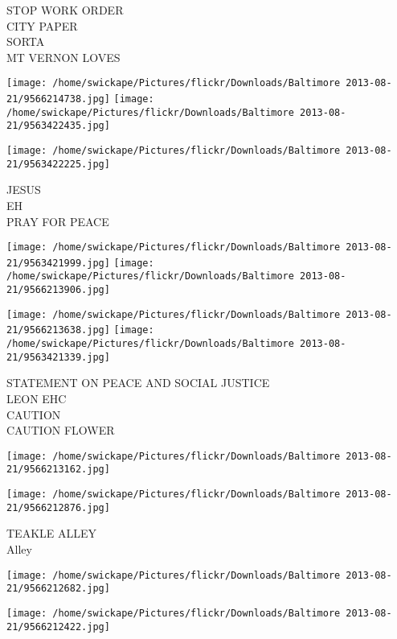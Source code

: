 \documentclass[10pt,letterpaper]{article}
\begin{document}
STOP WORK ORDER\\
CITY PAPER\\
SORTA\\
MT VERNON LOVES\\
\pagebreak

\texttt{[image: /home/swickape/Pictures/flickr/Downloads/Baltimore 2013-08-21/9566214738.jpg]}
\texttt{[image: /home/swickape/Pictures/flickr/Downloads/Baltimore 2013-08-21/9563422435.jpg]}

\vspace{0.25in}
\texttt{[image: /home/swickape/Pictures/flickr/Downloads/Baltimore 2013-08-21/9563422225.jpg]}

JESUS\\
EH\\
PRAY FOR PEACE\\
\pagebreak

\texttt{[image: /home/swickape/Pictures/flickr/Downloads/Baltimore 2013-08-21/9563421999.jpg]}
\texttt{[image: /home/swickape/Pictures/flickr/Downloads/Baltimore 2013-08-21/9566213906.jpg]}

\texttt{[image: /home/swickape/Pictures/flickr/Downloads/Baltimore 2013-08-21/9566213638.jpg]}
\texttt{[image: /home/swickape/Pictures/flickr/Downloads/Baltimore 2013-08-21/9563421339.jpg]}

STATEMENT ON PEACE AND SOCIAL JUSTICE\\
LEON EHC\\
CAUTION\\
CAUTION FLOWER\\
\pagebreak

\texttt{[image: /home/swickape/Pictures/flickr/Downloads/Baltimore 2013-08-21/9566213162.jpg]}

\vspace{0.25in}
\texttt{[image: /home/swickape/Pictures/flickr/Downloads/Baltimore 2013-08-21/9566212876.jpg]}

TEAKLE ALLEY\\
Alley\\
\pagebreak

\texttt{[image: /home/swickape/Pictures/flickr/Downloads/Baltimore 2013-08-21/9566212682.jpg]}

\vspace{0.25in}
\texttt{[image: /home/swickape/Pictures/flickr/Downloads/Baltimore 2013-08-21/9566212422.jpg]}
\end{document}

